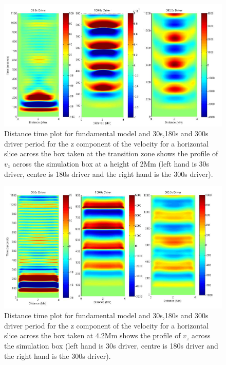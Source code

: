 \documentclass[authoryear,final,1p]{elsarticle}
\begin{document}
\begin{figure}[h]\label{fig8_dt_30_180_300_0_horiz_2Mm}
\includegraphics[scale=0.4]{images/fig6_dt_30_180_300_0_horiz_2Mm.jpg}
\caption{Distance time plot for fundamental model and 30s,180s and 300s driver period for the z component of the velocity for a horizontal slice across the box  taken at the transition zone shows  the profile of $v_{z}$ across the simulation box at a height of 2Mm (left hand is 30s driver, centre is 180s driver and the right hand is the 300s driver). }
\end{figure}



\begin{figure}[h]\label{fig9_dt_30_180_300_0_horiz_4p2Mm}
\includegraphics[scale=0.4]{images/fig7_dt_30_180_300_0_horiz_4p2Mm.jpg}
\caption{Distance time plot for fundamental model and 30s,180s and 300s driver period for the z component of the velocity for a horizontal slice across the box  taken at 4.2Mm shows  the profile of $v_{z}$ across the simulation box (left hand is 30s driver, centre is 180s driver and the right hand is the 300s driver). }
\end{figure}
\end{document}
